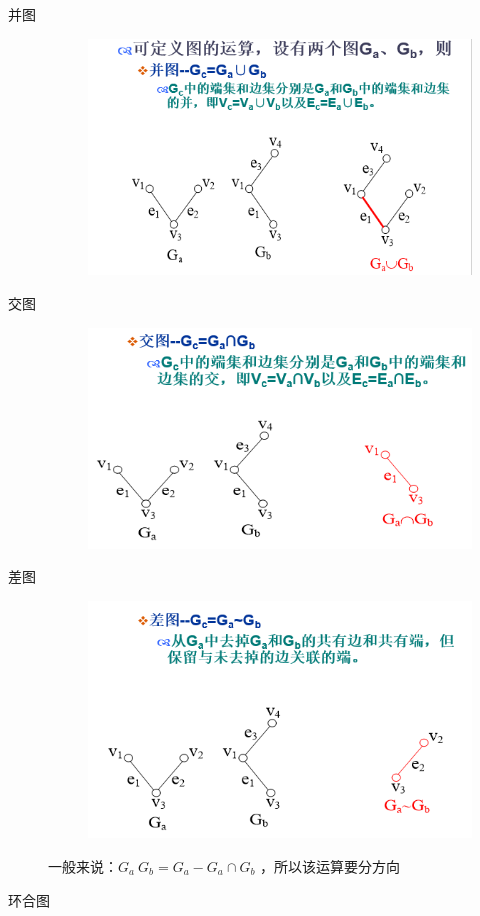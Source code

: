 \begin{description}
	\item[并图] 
	\begin{figure}[H]
		\centering
		\includegraphics[width=0.5\linewidth]{figures/screenshot039}
		\caption{}
		\label{fig:screenshot039}
	\end{figure}
	\item[交图] 
	\begin{figure}[H]
		\centering
		\includegraphics[width=0.7\linewidth]{figures/screenshot040}
		\caption{}
		\label{fig:screenshot040}
	\end{figure}
	\item[差图]
	 \begin{figure}[H]
		\centering
		\includegraphics[width=0.7\linewidth]{figures/screenshot041}
		\caption{}
		\label{fig:screenshot041}
	\end{figure}
	一般来说：$ G_a ~ G_b = G_a - G_a\cap G_b $ ，所以该运算要分方向
	\item[环合图] 
	\begin{figure}[H]

\end{figure}
\end{description}

